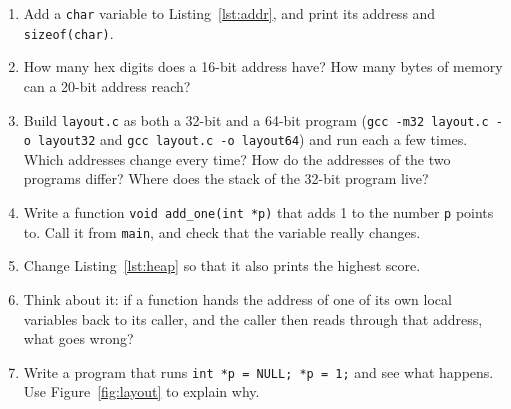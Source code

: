 \begin{enumerate}
  \item Add a \texttt{char} variable to Listing~\ref{lst:addr}, and print its address and \texttt{sizeof(char)}.
  \item How many hex digits does a 16-bit address have? How many bytes of memory can a 20-bit address reach?
  \item Build \texttt{layout.c} as both a 32-bit and a 64-bit program (\texttt{gcc -m32 layout.c -o layout32} and \texttt{gcc layout.c -o layout64}) and run each a few times. Which addresses change every time? How do the addresses of the two programs differ? Where does the stack of the 32-bit program live?
  \item Write a function \texttt{void add\_one(int *p)} that adds 1 to the number \texttt{p} points to. Call it from \texttt{main}, and check that the variable really changes.
  \item Change Listing~\ref{lst:heap} so that it also prints the highest score.
  \item Think about it: if a function hands the address of one of its own local variables back to its caller, and the caller then reads through that address, what goes wrong?
  \item Write a program that runs \texttt{int *p = NULL; *p = 1;} and see what happens. Use Figure~\ref{fig:layout} to explain why.
\end{enumerate}
